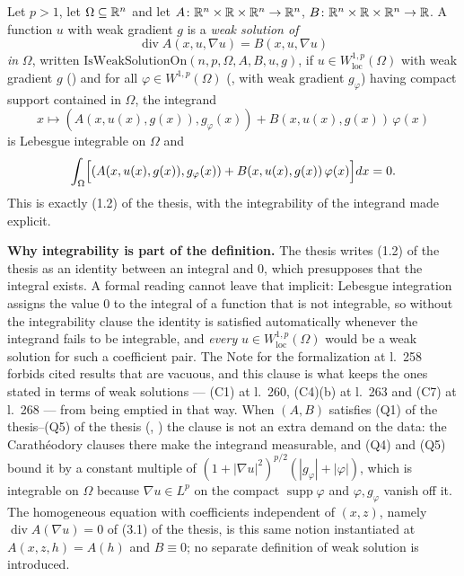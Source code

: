 \begin{definition}
Let $p>1$, let $\Omega\subseteq\mathbb{R}^n$ and let
$A\colon\mathbb{R}^n\times\mathbb{R}\times\mathbb{R}^n\to\mathbb{R}^n$,
$B\colon\mathbb{R}^n\times\mathbb{R}\times\mathbb{R}^n\to\mathbb{R}$.  A function $u$ with weak gradient $g$ is
a \emph{weak solution of}
\[
\operatorname{div}A(x,u,\nabla u)=B(x,u,\nabla u)
\]
\emph{in} $\Omega$, written $\mathrm{IsWeakSolutionOn}(n,p,\Omega,A,B,u,g)$, if
$u\in W^{1,p}_{\mathrm{loc}}(\Omega)$ with weak gradient $g$
() and for all $\varphi\in W^{1,p}(\Omega)$
(, with weak gradient $g_\varphi$) having compact support
contained in $\Omega$, the integrand
\[
x\longmapsto(A(x,u(x),g(x)),g_\varphi(x))+B(x,u(x),g(x))\,\varphi(x)
\]
is Lebesgue integrable on $\Omega$ and
\[
\int_\Omega\Bigl[(A(x,u(x),g(x)),g_\varphi(x))+B(x,u(x),g(x))\,\varphi(x)\Bigr]dx=0 .
\]
This is exactly (1.2) of the thesis, with the integrability of the integrand made
explicit.

\noindent\textbf{Why integrability is part of the definition.}  The thesis writes
(1.2) of the thesis as an identity between an integral and $0$, which presupposes
that the integral exists.  A formal reading cannot leave that implicit: Lebesgue
integration assigns the value $0$ to the integral of a function that is not
integrable, so without the integrability clause the identity is satisfied
automatically whenever the integrand fails to be integrable, and \emph{every}
$u\in W^{1,p}_{\mathrm{loc}}(\Omega)$ would be a weak solution for such a
coefficient pair.  The Note for the formalization at l.~258 forbids cited
results that are vacuous, and this clause is what keeps the ones stated in terms
of weak solutions --- (C1) at l.~260, (C4)(b) at l.~263 and (C7) at l.~268 ---
from being emptied in that way.  When $(A,B)$ satisfies
(Q1) of the thesis--(Q5) of the thesis (,
) the clause is not an extra demand on the data:
the Carath\'eodory clauses there make the integrand measurable, and (Q4) and (Q5)
bound it by a constant multiple of $(1+|\nabla u|^2)^{p/2}(|g_\varphi|+|\varphi|)$,
which is integrable on $\Omega$ because $\nabla u\in L^p$ on the compact
$\operatorname{supp}\varphi$ and $\varphi,g_\varphi$ vanish off it.  The homogeneous equation with coefficients
independent of $(x,z)$, namely $\operatorname{div}A(\nabla u)=0$ of (3.1) of the thesis,
is this same notion instantiated at
$A(x,z,h)=A(h)$ and $B\equiv0$; no separate definition of weak solution is
introduced.
\end{definition}
